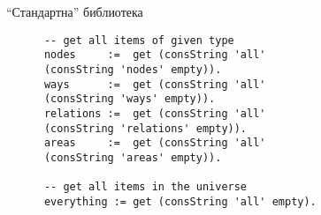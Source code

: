 \documentclass[9pt]{beamer}
\begin{document}
  \begin{frame}[fragile]{``Стандартна'' библиотека}
    \begin{lstwrap}\begin{lstlisting}
      -- get all items of given type
      nodes     :=  get (consString 'all'
      (consString 'nodes' empty)).
      ways      :=  get (consString 'all'
      (consString 'ways' empty)).
      relations :=  get (consString 'all'
      (consString 'relations' empty)).
      areas     :=  get (consString 'all'
      (consString 'areas' empty)).

      -- get all items in the universe
      everything := get (consString 'all' empty).
    \end{lstlisting}\end{lstwrap}
  \end{frame}
\end{document}
